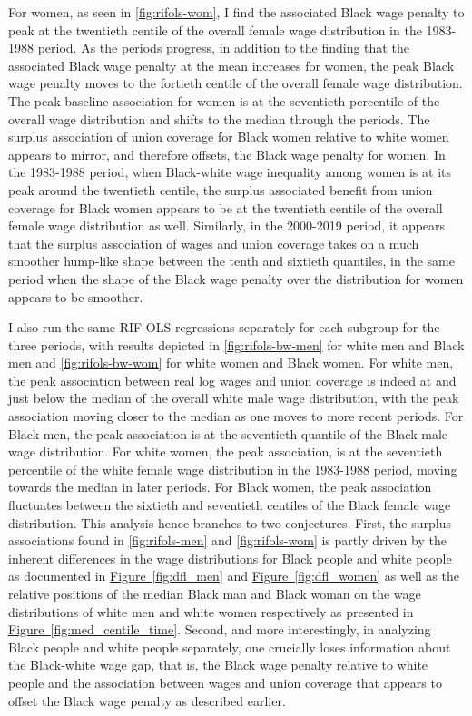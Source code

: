 \documentclass[11pt]{article}
\begin{document}
For women, as seen in \autoref{fig:rifols-wom}, I find the associated Black wage penalty to peak at the twentieth centile of the overall female wage distribution in the 1983-1988 period. As the periods progress, in addition to the finding that the associated Black wage penalty at the mean increases for women, the peak Black wage penalty moves to the fortieth centile of the overall female wage distribution. The peak baseline association for women is at the seventieth percentile of the overall wage distribution and shifts to the median through the periods. The surplus association of union coverage for Black women relative to white women appears to mirror, and therefore offsets, the Black wage penalty for women. In the 1983-1988 period, when Black-white wage inequality among women is at its peak around the twentieth centile, the surplus associated benefit from union coverage for Black women appears to be at the twentieth centile of the overall female wage distribution as well. Similarly, in the 2000-2019 period, it appears that the surplus association of wages and union coverage takes on a much smoother hump-like shape between the tenth and sixtieth quantiles, in the same period when the shape of the Black wage penalty over the distribution for women appears to be smoother. 

I also run the same RIF-OLS regressions separately for each subgroup for the three periods, with results depicted in \autoref{fig:rifols-bw-men} for white men and Black men and \autoref{fig:rifols-bw-wom} for white women and Black women. For white men, the peak association between real log wages and union coverage is indeed at and just below the median of the overall white male wage distribution, with the peak association moving closer to the median as one moves to more recent periods. For Black men, the peak association is at the seventieth quantile of the Black male wage distribution. For white women, the peak association, is at the seventieth percentile of the white female wage distribution in the 1983-1988 period, moving towards the median in later periods. For Black women, the peak association fluctuates between the sixtieth and seventieth centiles of the Black female wage distribution. This analysis hence branches to two conjectures. First, the surplus associations found in \autoref{fig:rifols-men} and \autoref{fig:rifols-wom} is partly driven by the inherent differences in the wage distributions for Black people and white people as documented in \hyperref[fig:dfl_men]{Figure~\ref*{fig:dfl_men}} and \hyperref[fig:dfl_women]{Figure~\ref*{fig:dfl_women}} as well as the relative positions of the median Black man and Black woman on the wage distributions of white men and white women respectively as presented in \hyperref[fig:med_centile_time]{Figure~\ref*{fig:med_centile_time}}. Second, and more interestingly, in analyzing Black people and white people separately, one crucially loses information about the Black-white wage gap, that is, the Black wage penalty relative to white people and the association between wages and union coverage that appears to offset the Black wage penalty as described earlier. 
\end{document}
